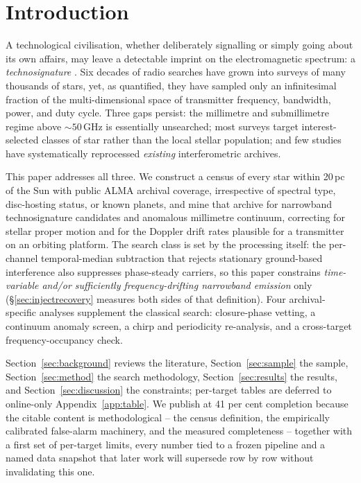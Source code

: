 \documentclass{openjournal}
\begin{document}
\section{Introduction}
\label{sec:intro}

A technological civilisation, whether deliberately signalling or
simply going about its own affairs, may leave a detectable imprint on
the electromagnetic spectrum: a \emph{technosignature}
\citep{Sheikh2020,SETIreview2025}. Six decades of radio searches have
grown into surveys of many thousands of stars, yet, as
\citet{Wright2018} quantified, they have sampled only an infinitesimal
fraction of the multi-dimensional space of transmitter frequency,
bandwidth, power, and duty cycle. Three gaps persist: the
millimetre and submillimetre regime above ${\sim}50$\,GHz is
essentially unsearched; most surveys target interest-selected classes
of star rather than the local stellar population; and few studies have
systematically reprocessed \emph{existing} interferometric archives.

This paper addresses all three. We construct a census of every star
within 20\,pc of the Sun with public ALMA archival coverage,
irrespective of spectral type, disc-hosting status, or known planets,
and mine that archive for narrowband technosignature candidates and
anomalous millimetre continuum, correcting for stellar proper motion
and for the Doppler drift rates plausible for a transmitter on an
orbiting platform. The search class is set by the processing itself:
the per-channel temporal-median subtraction that rejects stationary
ground-based interference also suppresses phase-steady carriers, so
this paper constrains \emph{time-variable and/or sufficiently
frequency-drifting narrowband emission} only
(\S\ref{sec:injectrecovery} measures both sides of that definition).
Four archival-specific analyses supplement the classical search:
closure-phase vetting, a continuum anomaly screen, a chirp and
periodicity re-analysis, and a cross-target frequency-occupancy check.

Section~\ref{sec:background} reviews the literature,
Section~\ref{sec:sample} the sample, Section~\ref{sec:method} the
search methodology, Section~\ref{sec:results} the results, and
Section~\ref{sec:discussion} the constraints; per-target tables are
deferred to online-only Appendix~\ref{app:table}. We publish at 41 per
cent completion because the citable content is methodological -- the
census definition, the empirically calibrated false-alarm machinery,
and the measured completeness -- together with a first set of
per-target limits, every number tied to a frozen pipeline and a named
data snapshot that later work will supersede row by row without
invalidating this one.
\end{document}
